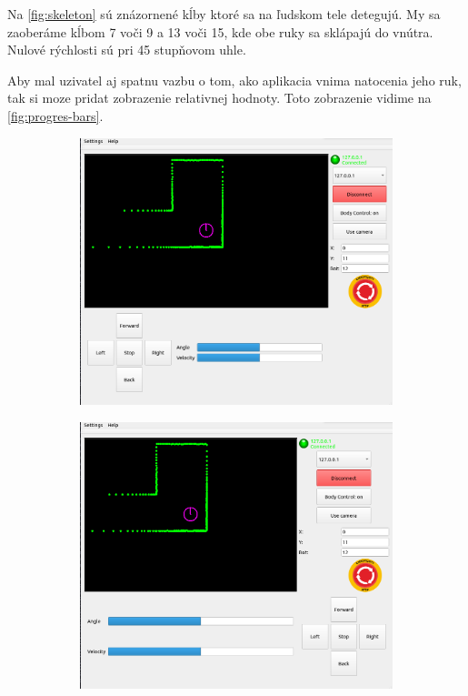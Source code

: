 \newpage

Na \ref{fig:skeleton} sú znázornené kĺby ktoré sa na ľudskom tele detegujú. My sa zaoberáme kĺbom 7 voči 9 a 13 voči 15, kde obe ruky
sa sklápajú do vnútra. Nulové rýchlosti sú pri 45 stupňovom uhle.

Aby mal uzivatel aj spatnu vazbu o tom, ako aplikacia vnima natocenia jeho ruk, tak si moze pridat zobrazenie relativnej
hodnoty. Toto zobrazenie vidime na \ref{fig:progres-bars}.

\begin{figure}[!htbp]
	\centering

	\begin{subfigure}{0.49\textwidth}
		\includegraphics[width=\textwidth]{img/left-hand-body-control.png}
	\end{subfigure}
	\hfill
	\begin{subfigure}{0.49\textwidth}
		\includegraphics[width=\textwidth]{img/right-hand-body-control.png}
	\end{subfigure}


\end{figure}
